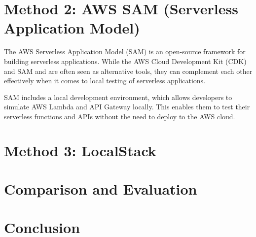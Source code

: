 \documentclass{article}
\begin{document}
\section{Method 2: AWS SAM (Serverless Application Model)}
The AWS Serverless Application Model (SAM) is an open-source framework for building serverless applications.
While the AWS Cloud Development Kit (CDK) and SAM and  are often seen as alternative tools, they can complement each other effectively when it comes to local testing of serverless applications.

SAM includes a local development environment, which allows developers to simulate AWS Lambda and API Gateway locally. This enables them to test their serverless functions and APIs without the need to deploy to the AWS cloud.


\section{Method 3: LocalStack}

\section{Comparison and Evaluation}

\section{Conclusion}
\end{document}
